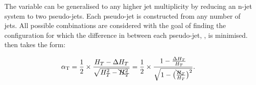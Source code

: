 The \alphat variable can be generalised to any higher jet multiplicity by reducing an n-jet
system to two pseudo-jets. Each pseudo-jet is constructed from any number of jets.
All possible combinations are considered with the goal of finding the configuration
for which the difference in \HT between each pseudo-jet, \deltaHT, is minimised.
\alphat then takes the form:

% 
\begin{equation}
\alpha_{\text{T}} = \frac{1}{2} \times \frac{H_T-\Delta H_T}{\sqrt{H_T^2 - \bcancel{H}_T^2}} = 
\frac{1}{2} \times \frac{1-\frac{\Delta H_T}{H_T}}{\sqrt{1 - \big(\frac{\bcancel{H}_T}
{H_T}\big)^2}}.
\label{eq:alphat_njet}
\end{equation}
% 

